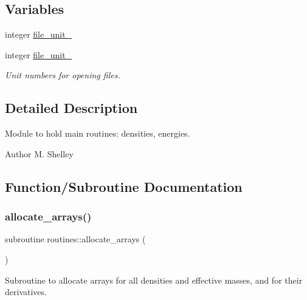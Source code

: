 \subsection*{Variables}
\begin{DoxyCompactItemize}
\item 
integer \mbox{\hyperlink{namespaceroutines_a4433ed4e6fbf0c81f38d8df1749be025}{file\+\_\+unit\+\_}}
\item 
integer \mbox{\hyperlink{namespaceroutines_a806b34a65a0678e540be124100a0f908}{file\+\_\+unit\+\_}}
\begin{DoxyCompactList}\small\item\em Unit numbers for opening files. \end{DoxyCompactList}\end{DoxyCompactItemize}


\subsection{Detailed Description}
Module to hold main routines\+: densities, energies. 

\begin{DoxyAuthor}{Author}
M. Shelley 
\end{DoxyAuthor}


\subsection{Function/\+Subroutine Documentation}
\mbox{\label{namespaceroutines_a0d41e4cd4e61ac1463c75055bf784e8b}} 
\subsubsection{\texorpdfstring{allocate\+\_\+arrays()}{allocate\_arrays()}}
{\footnotesize\ttfamily subroutine routines\+::allocate\+\_\+arrays (\begin{DoxyParamCaption}{ }\end{DoxyParamCaption})}



Subroutine to allocate arrays for all densities and effective masses, and for their derivatives. 

